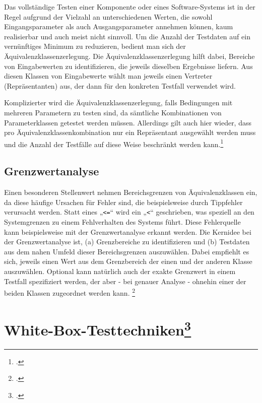\documentclass{lehramt-informatik-haupt}
\begin{document}
Das vollständige Testen einer Komponente oder eines Software-Systems ist
in der Regel aufgrund der Vielzahl an unterschiedenen Werten, die sowohl
Eingangsparameter als auch Ausgangsparameter annehmen können, kaum
realisierbar und auch meist nicht sinnvoll. Um die Anzahl der Testdaten
auf ein vernünftiges Minimum zu reduzieren, bedient man sich der
Äquivalenzklassenzerlegung. Die Äquivalenzklassenzerlegung hilft dabei,
Bereiche von Eingabewerten zu identifizieren, die jeweils dieselben
Ergebnisse liefern. Aus diesen Klassen von Eingabewerte wählt man
jeweils einen Vertreter (Repräsentanten) aus, der dann für den konkreten
Testfall verwendet wird.

Komplizierter wird die Äquivalenzklassenzerlegung, falls Bedingungen mit
mehreren Parametern zu testen sind, da sämtliche Kombinationen von
Parameterklassen getestet werden müssen. Allerdings gilt auch hier
wieder, dass pro Äquivalenzklassenkombination nur ein Repräsentant
ausgewählt werden muss und die Anzahl der Testfälle auf diese Weise
beschränkt werden kann.\footcite[Seite 142]{schatten}

%

\subsection{Grenzwertanalyse}

Einen besonderen Stellenwert nehmen Bereichsgrenzen von
Äquivalenzklassen ein, da diese häufige Ursachen für Fehler sind, die
beispielsweise durch Tippfehler verursacht werden. Statt eines
„\texttt{<=}“ wird ein „\texttt{<}“ geschrieben, was speziell an den
Systemgrenzen zu einem Fehlverhalten des Systems führt. Diese
Fehlerquelle kann beispielsweise mit der Grenzwertanalyse erkannt
werden. Die Kernidee bei der Grenzwertanalyse ist, (a) Grenzbereiche zu
identifizieren und (b) Testdaten aus dem nahen Umfeld dieser
Bereichsgrenzen auszuwählen. Dabei empfiehlt es sich, jeweils einen Wert
aus dem Grenzbereich der einen und der anderen Klasse auszuwählen.
Optional kann natürlich auch der exakte Grenzwert in einem Testfall
spezifiziert werden, der aber - bei genauer Analyse - ohnehin einer der
beiden Klassen zugeordnet werden kann.
\footcite[Seite 142]{schatten}

%

\section{White-Box-Testtechniken\footcite[Seite 199-246]{hoffmann}}
\end{document}
